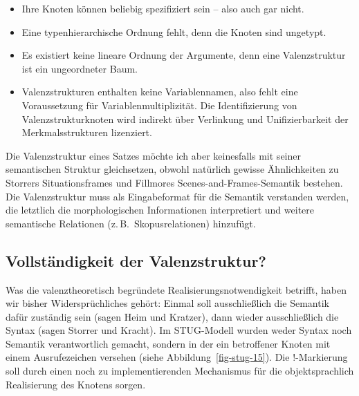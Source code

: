 {\begin{itemize}
  \item Ihre Knoten können beliebig spezifiziert sein -- also auch gar nicht. 
  \item Eine typenhierarchische Ordnung fehlt, denn die Knoten sind ungetypt.
  \item Es existiert keine lineare Ordnung der Argumente, denn eine Valenzstruktur ist ein ungeordneter Baum.
  \item Valenzstrukturen enthalten keine Variablennamen, also fehlt eine Voraussetzung für Variablenmultiplizität. Die Identifizierung von Valenzstrukturknoten wird indirekt über Verlinkung und Unifizierbarkeit der Merkmalsstrukturen lizenziert.
\end{itemize} 
Die Valenzstruktur eines Satzes möchte ich aber keinesfalls mit seiner semantischen Struktur gleichsetzen, obwohl natürlich gewisse Ähnlichkeiten zu Storrers Situationsframes und  Fillmores Scenes-and-Frames-Semantik bestehen. Die Valenzstruktur muss als Eingabeformat für die Semantik verstanden werden, die letztlich die morphologischen Informationen interpretiert und weitere semantische Relationen (z.\,B.\ Skopusrelationen) hinzufügt. 


\subsection{Vollständigkeit der Valenzstruktur?} \label{sec-stug-vollst}

Was die valenztheoretisch begründete Realisierungsnotwendigkeit betrifft, haben wir bisher Widersprüchliches gehört: Einmal soll ausschlie\ss lich die Semantik dafür zuständig sein (sagen Heim und Kratzer), dann wieder ausschlie\ss lich die Syntax (sagen Storrer und Kracht). Im STUG-Modell wurden weder Syntax noch Semantik verantwortlich gemacht, sondern  in der  ein betroffener Knoten mit einem Ausrufezeichen versehen (siehe Abbildung~\ref{fig-stug-15}). Die !-Markierung soll durch einen noch zu implementierenden Mechanismus für die objektsprachlich Realisierung des Knotens sorgen. 

}
